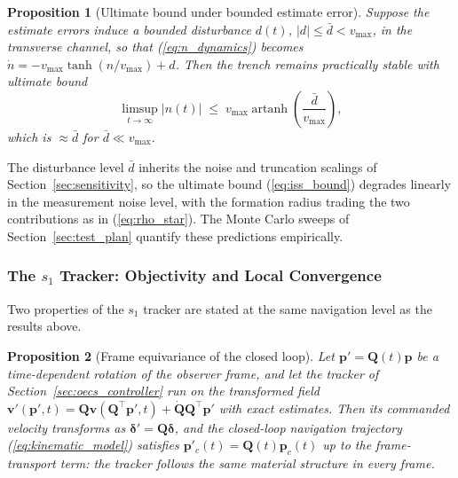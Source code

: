 \documentclass[lettersize,journal]{IEEEtran}
\newtheorem{proposition}{Proposition}
\begin{document}
\begin{proposition}[Ultimate bound under bounded estimate error]
\label{prop:iss}
Suppose the estimate errors induce a bounded disturbance $d(t)$, $|d|
\leq \bar{d} < v_{\max}$, in the transverse channel, so that
(\ref{eq:n_dynamics}) becomes $\dot{n} = -v_{\max}\tanh(n/v_{\max}) +
d$. Then the trench remains practically stable with ultimate bound
\begin{equation}
    \limsup_{t\to\infty} |n(t)| \;\leq\;
    v_{\max}\operatorname{artanh}\!\left(\frac{\bar{d}}{v_{\max}}\right),
    \label{eq:iss_bound}
\end{equation}
which is $\approx \bar{d}$ for $\bar{d} \ll v_{\max}$.
\end{proposition}

The disturbance level $\bar{d}$ inherits the noise and truncation
scalings of Section~\ref{sec:sensitivity}, so the ultimate bound
(\ref{eq:iss_bound}) degrades linearly in the measurement noise level,
with the formation radius trading the two contributions as in
(\ref{eq:rho_star}). The Monte Carlo sweeps of
Section~\ref{sec:test_plan} quantify these predictions empirically.

\subsubsection{The $s_1$ Tracker: Objectivity and Local Convergence}
\label{sec:stab_oecs}

Two properties of the $s_1$ tracker are stated at the same navigation
level as the results above.

\begin{proposition}[Frame equivariance of the closed loop]
\label{prop:equivariance}
Let $\mathbf{p}'= \mathbf{Q}(t)\mathbf{p}$ be a time-dependent rotation
of the observer frame, and let the tracker of
Section~\ref{sec:oecs_controller} run on the transformed field
$\mathbf{v}'(\mathbf{p}', t) = \mathbf{Q}\mathbf{v}(\mathbf{Q}^\top
\mathbf{p}', t) + \dot{\mathbf{Q}}\mathbf{Q}^\top\mathbf{p}'$ with
exact estimates. Then its commanded velocity transforms as
$\boldsymbol{\delta}' = \mathbf{Q}\boldsymbol{\delta}$, and the
closed-loop navigation trajectory (\ref{eq:kinematic_model}) satisfies
$\mathbf{p}'_c(t) = \mathbf{Q}(t)\mathbf{p}_c(t)$ up to the
frame-transport term: the tracker follows the same material structure
in every frame.
\end{proposition}
\end{document}
